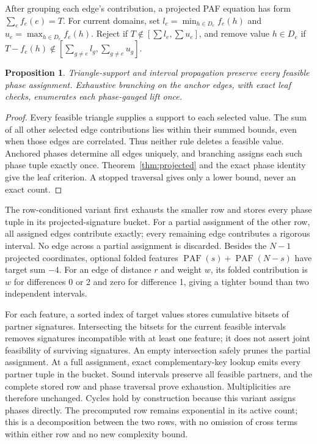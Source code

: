 \documentclass[11pt]{article}
\newtheorem{proposition}[theorem]{Proposition}
\newcommand{\PAF}{\operatorname{PAF}}
\begin{document}
After grouping each edge's contribution, a projected PAF equation has form
$\sum_e f_e(e)=T$. For current domains, set
$l_e=\min_{h\in D_e}f_e(h)$ and $u_e=\max_{h\in D_e}f_e(h)$.
Reject if $T\notin[\sum l_e,\sum u_e]$, and remove value $h\in D_e$
if $T-f_e(h)\notin[\sum_{g\ne e}l_g,\sum_{g\ne e}u_g]$.
\begin{proposition}
Triangle-support and interval propagation preserve every feasible phase
assignment. Exhaustive branching on the anchor edges, with exact leaf
checks, enumerates each phase-gauged lift once.
\end{proposition}
\begin{proof}
Every feasible triangle supplies a support to each selected value. The sum
of all other selected edge contributions lies within their summed bounds,
even when those edges are correlated. Thus neither rule deletes a feasible
value. Anchored phases determine all edges uniquely, and branching assigns
each such phase tuple exactly once. Theorem~\ref{thm:projected} and the exact
phase identity give the leaf criterion. A stopped traversal gives only a
lower bound, never an exact count.
\end{proof}

The row-conditioned variant first exhausts the smaller row and stores every
phase tuple in its projected-signature bucket. For a partial assignment of
the other row, all assigned edges contribute exactly; every remaining edge
contributes a rigorous interval. No edge across a partial assignment is
discarded. Besides the $N-1$ projected coordinates, optional folded features
$\PAF(s)+\PAF(N-s)$ have target sum $-4$. For an edge of distance $r$
and weight $w$, its folded contribution is $w$ for differences 0 or 2 and
zero for difference 1, giving a tighter bound than two independent intervals.

For each feature, a sorted index of target values stores cumulative bitsets
of partner signatures. Intersecting the bitsets for the current feasible
intervals removes signatures incompatible with at least one feature; it
does not assert joint feasibility of surviving signatures. An empty
intersection safely prunes the partial assignment. At a full assignment,
exact complementary-key lookup emits every partner tuple in the bucket.
Sound intervals preserve all feasible partners, and the complete stored
row and phase traversal prove exhaustion. Multiplicities are therefore
unchanged. Cycles hold by construction because this variant assigns phases
directly. The precomputed row remains exponential in its active count;
this is a decomposition between the two rows, with no omission of cross
terms within either row and no new complexity bound.
\end{document}
